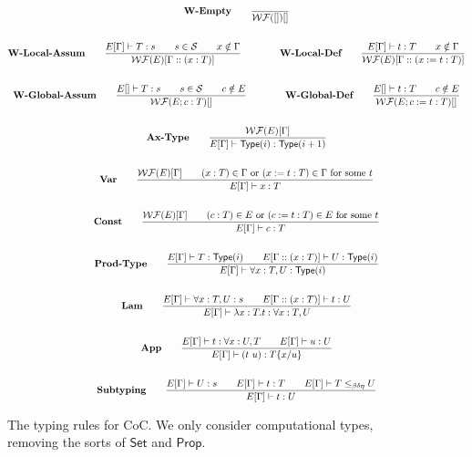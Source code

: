 \documentclass{article}
\begin{document}
\begin{figure}[h]
    \begin{gather*}
        \textbf{W-Empty} \qquad
        \frac{}{\mathcal{WF}([])[]}\\
        \\
        \textbf{W-Local-Assum} \qquad
        \frac{E[\Gamma]\vdash T:s \qquad s \in \mathcal{S} \qquad x \notin \Gamma}{\mathcal{WF}(E)[\Gamma::(x:T)]}
        \qquad \qquad
        \textbf{W-Local-Def} \qquad
        \frac{E[\Gamma]\vdash t : T \qquad x \notin \Gamma}{\mathcal{WF}(E)[\Gamma ::(x:=t:T)]} \\
        \\
        \textbf{W-Global-Assum} \qquad
        \frac{E[]\vdash T:s \qquad s \in \mathcal{S} \qquad c \notin E}{\mathcal{WF}(E; c:T)[]}
        \qquad \qquad
        \textbf{W-Global-Def} \qquad
        \frac{E[]\vdash t:T \qquad c \notin E}{\mathcal{WF}(E; c:=t:T)[]} \\
        \\
        \textbf{Ax-Type} \qquad
        \frac{\mathcal{WF}(E)[\Gamma]}{E[\Gamma]\vdash \mathsf{Type}(i):\mathsf{Type}(i+1)} \\
        \\
        \textbf{Var} \qquad
        \frac{\mathcal{WF}(E)[\Gamma] \qquad (x:T) \in \Gamma \text{ or } (x := t : T) \in \Gamma \text{ for some $t$}}{E[\Gamma] \vdash x : T} \\
        \\
        \textbf{Const} \qquad
        \frac{\mathcal{WF}(E)[\Gamma] \qquad (c:T) \in E \text{ or } (c := t : T) \in E \text{ for some $t$}}{E[\Gamma] \vdash c : T} \\
        \\
        \textbf{Prod-Type} \qquad
        \frac{E[\Gamma] \vdash T:\mathsf{Type}(i)\qquad E[\Gamma::(x:T)]\vdash U:\mathsf{Type}(i)}{E[\Gamma] \vdash \forall x: T, U : \mathsf{Type}(i)} \\
        \\
        \textbf{Lam} \qquad
        \frac{E[\Gamma] \vdash \forall x:T, U : s \qquad E[\Gamma :: (x:T)]\vdash t : U}{E[\Gamma] \vdash \lambda x:T . t : \forall x : T, U} \\
        \\
        \textbf{App} \qquad
        \frac{E[\Gamma] \vdash t:\forall x:U, T \qquad E[\Gamma] \vdash u:U}{E[\Gamma] \vdash (t\ u):T\{x/u\}} \\
        \\
        \textbf{Subtyping} \qquad
        \frac{E[\Gamma] \vdash U : s \qquad E[\Gamma] \vdash t : T \qquad E[\Gamma] \vdash T \leq_{\beta\delta\eta} U}{E[\Gamma]\vdash t:U}
    \end{gather*}
    \caption{
    The typing rules for CoC. 
    We only consider computational types, removing the sorts of $\mathsf{Set}$ and $\mathsf{Prop}$.}
\end{figure}
\end{document}
